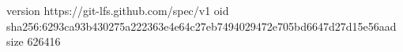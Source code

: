 version https://git-lfs.github.com/spec/v1
oid sha256:6293ca93b430275a222363e4e64c27eb7494029472e705bd6647d27d15e56aad
size 626416
